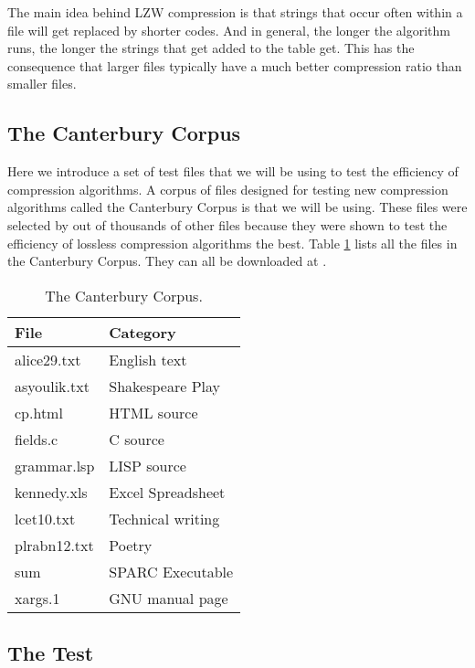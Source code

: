 The main idea behind LZW compression is that strings that occur often
within a file will get replaced by shorter codes. And in general, the
longer the algorithm runs, the longer the strings that get added to
the table get. This has the consequence that larger files typically
have a much better compression ratio than smaller files.

\subsection{The Canterbury Corpus}

Here we introduce a set of test files that we will be using to test
the efficiency of compression algorithms. A corpus of files designed
for testing new compression algorithms called the Canterbury Corpus is
that we will be using. These files were selected by
\cite{arnold:corpus} out of thousands of other files because they were
shown to test the efficiency of lossless compression algorithms the
best. Table \ref{tab:corp-files} lists all the files in the Canterbury
Corpus. They can all be downloaded at \cite{powell:desc-corp}.

\begin{table}
  \centering
  \begin{tabular}{ll}
    \toprule
    File & Category \\
    \midrule
    alice29.txt & English text \\
    asyoulik.txt & Shakespeare Play \\
    cp.html & HTML source \\
    fields.c & C source \\
    grammar.lsp & LISP source \\
    kennedy.xls & Excel Spreadsheet \\
    lcet10.txt & Technical writing \\
    plrabn12.txt & Poetry \\
    sum & SPARC Executable \\
    xargs.1 & GNU manual page \\
    \bottomrule

  \end{tabular}
  \caption{The Canterbury Corpus.}
  \label{tab:corp-files}
\end{table}

\subsection{The Test}

